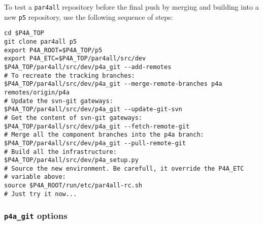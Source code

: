 \documentclass[a4paper]{article}
\begin{document}
To test a \texttt{par4all} repository before the final push by
merging and building into a new \texttt{p5} repository, use the
following sequence of steps:
\begin{verbatim}
cd $P4A_TOP
git clone par4all p5
export P4A_ROOT=$P4A_TOP/p5
export P4A_ETC=$P4A_TOP/par4all/src/dev
$P4A_TOP/par4all/src/dev/p4a_git --add-remotes
# To recreate the tracking branches:
$P4A_TOP/par4all/src/dev/p4a_git --merge-remote-branches p4a remotes/origin/p4a
# Update the svn-git gateways:
$P4A_TOP/par4all/src/dev/p4a_git --update-git-svn
# Get the content of svn-git gateways:
$P4A_TOP/par4all/src/dev/p4a_git --fetch-remote-git
# Merge all the component branches into the p4a branch:
$P4A_TOP/par4all/src/dev/p4a_git --pull-remote-git
# Build all the infrastructure:
$P4A_TOP/par4all/src/dev/p4a_setup.py
# Source the new environment. Be carefull, it override the P4A_ETC
# variable above:
source $P4A_ROOT/run/etc/par4all-rc.sh
# Just try it now...
\end{verbatim}


\subsubsection{\protect\texttt{p4a\_git} options}
\label{sec:p4a_git-options}
\end{document}
